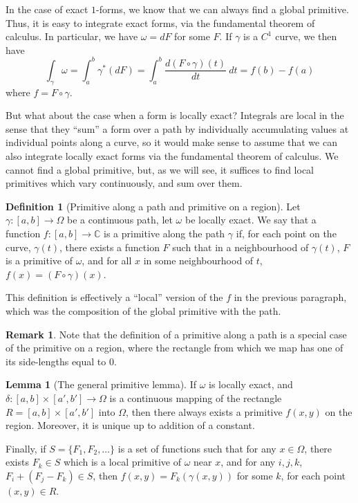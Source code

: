 \documentclass[aps,pra,showpacs,notitlepage,onecolumn,superscriptaddress,nofootinbib]{revtex4-1}
\theoremstyle{definition}
\newtheorem{definition}{Definition}[section]
\newtheorem{lemma}{Lemma}[section]
\newtheorem{remark}{Remark}[section]
\newcommand{\hhrulefill}{\hspace{-1.5em} \hrulefill}
\begin{document}
In the case of exact $1$-forms, we know that we can always find a global primitive. Thus, it is easy to integrate exact forms, via the fundamental theorem
of calculus. In particular, we have $\omega = dF$ for some $F$. If $\gamma$ is a $C^1$ curve, we then have
\begin{equation}
  \displaystyle\int_{\gamma} \omega = \displaystyle\int_{a}^{b} \gamma^{*}(dF) = \displaystyle\int_{a}^{b} \frac{d (F \circ \gamma)(t)}{dt} \ dt = f(b) - f(a)
\end{equation}
where $f = F \circ \gamma$.

But what about the case when a form is locally exact? Integrals are local in the sense that they ``sum'' a form over a path by individually accumulating values
at individual points along a curve, so it would make sense to assume that we can also integrate locally exact forms via the fundamental theorem of calculus.
We cannot find a global primitive, but, as we will see, it suffices to find local primitives which vary continuously, and sum over them.


\begin{definition}[Primitive along a path and primitive on a region]
  Let $\gamma : [a, b] \rightarrow \Omega$ be a continuous path, let $\omega$ be locally exact. We say that a function $f : [a, b] \rightarrow \mathbb{C}$ is a primitive along the path $\gamma$
  if, for each point on the curve, $\gamma(t)$, there exists a function $F$ such that in a neighbourhood of $\gamma(t)$, $F$ is a primitive of $\omega$, and for all $x$ in
  some neighbourhood of $t$, $f(x) = (F \circ \gamma)(x)$.

  
\end{definition}

\noindent This definition is effectively a ``local'' version of the $f$ in the previous paragraph, which was the composition of the global primitive with the path.

\begin{remark}
  Note that the definition of a primitive along a path is a special case of the primitive on a region, where the rectangle from which we map
  has one of its side-lengths equal to $0$.
\end{remark}

\hhrulefill

\begin{lemma}[The general primitive lemma]
  If $\omega$ is locally exact, and $\delta : [a, b] \times [a', b'] \rightarrow \Omega$ is a continuous mapping of the rectangle $R = [a, b] \times [a', b']$ into
  $\Omega$, then there always exists a primitive $f(x, y)$ on the region. Moreover, it is unique up to addition of a constant.

  Finally, if $S = \{F_1, F_2, \dots\}$ is a set of functions
  such that for any $x \in \Omega$, there exists $F_k \in S$ which is a local primitive of $\omega$ near $x$, and for any $i, j, k$, $F_i + (F_j - F_k) \in S$, then $f(x, y) = F_k(\gamma(x, y))$
  for some $k$, for each point $(x, y) \in R$.
\end{lemma}
\end{document}
